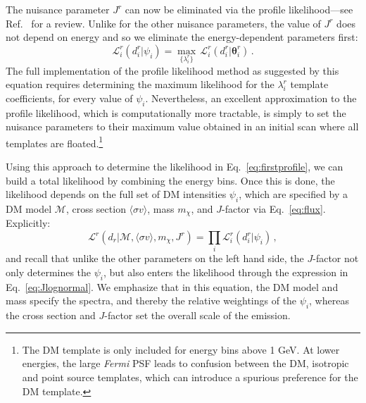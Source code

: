 The nuisance parameter $J^r$ can now be eliminated via the profile likelihood---see Ref.~\cite{Rolke:2004mj} for a review. Unlike for the other nuisance parameters, the value of $J^r$ does not depend on energy and so we eliminate the energy-dependent parameters first:
\begin{equation}
\mathcal{L}_i^r(d_i^r | \psi_i) = \max_{\{\lambda_i^r\}}\,\mathcal{L}_i^r \left( d_i^r | \boldsymbol{\theta}_i^r \right)\,.
\label{eq:firstprofile}
\end{equation}
The full implementation of the profile likelihood method as suggested by this equation requires determining the maximum likelihood for the $\lambda_i^r$ template coefficients, for every value of $\psi_i$.  Nevertheless, an excellent approximation to the profile likelihood, which is computationally more tractable, is simply to set the nuisance parameters to their maximum value obtained in an initial scan where all templates are floated.\footnote{The DM template is only included for energy bins above 1 GeV.  At lower energies, the large \textit{Fermi} PSF leads to confusion between the DM, isotropic and point source templates, which can introduce a spurious preference for the DM template.} 

Using this approach to determine the likelihood in Eq.~\ref{eq:firstprofile}, we can build a total likelihood by combining the energy bins. Once this is done, the likelihood  depends on the full set of DM intensities $\psi_i$, which are specified by a DM model $\mathcal{M}$, cross section $\langle \sigma v \rangle$, mass $m_{\chi}$, and $J$-factor via Eq.~\ref{eq:flux}. Explicitly:
\begin{equation}
\mathcal{L}^r(d_r | \mathcal{M}, \langle \sigma v \rangle, m_\chi, J^r) = \prod_i \mathcal{L}_i^r(d_i^r | \psi_i)\,,
\end{equation}
and recall that unlike the other parameters on the left hand side, the $J$-factor not only determines the $\psi_i$, but also enters the likelihood through the expression in Eq.~\ref{eq:Jlognormal}. We emphasize that in this equation, the DM model and mass specify the spectra, and thereby the relative weightings of the $\psi_i$, whereas the cross section and $J$-factor set the overall scale of the emission.

